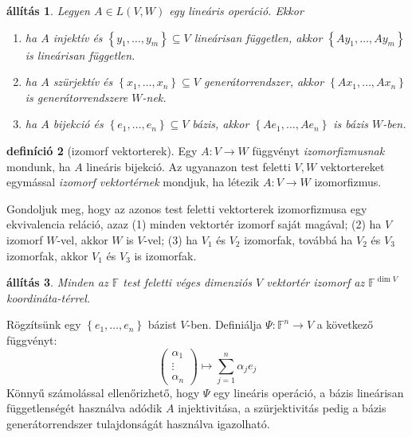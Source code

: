 \documentclass[9pt, showtrims]{memoir}
\makeatletter
\renewenvironment{proof}[1][\proofname]
    {\par\pushQED{\qed}%
    \normalfont \topsep6\p@\@plus6\p@\relax
    \trivlist
    \item[\hskip\labelsep
        \itshape
    #1\@addpunct{:}]\ignorespaces}
    {\popQED\endtrivlist\@endpefalse}
\theoremstyle{plain}
\newtheorem{proposition}{állítás}[section]
\theoremstyle{remark}
\theoremstyle{definition}
\newtheorem{definition}[proposition]{definíció}
\renewcommand{\mathbf}{\mathbb}
\makeatother
\begin{document}
\begin{proposition}
    Legyen $A\in L\left( V,W \right)$ egy lineáris operáció.
    Ekkor
    \begin{enumerate}
        \item ha $A$ injektív és $\left\{ y_1,\dots,y_m \right\}\subseteq V$
            lineárisan független,
            akkor 
            $\left\{ Ay_1,\dots,Ay_m \right\}$ is lineárisan független.
        \item ha $A$ szürjektív és $\left\{ x_1,\dots,x_n \right\}\subseteq V$
            generátorrendszer,
            akkor 
            $\left\{ Ax_1,\dots,Ax_n \right\}$ is generátorrendszere $W$-nek.
        \item ha $A$ bijekció és $\left\{ e_1,\dots,e_n \right\}\subseteq V$
            bázis,
            akkor 
            $\left\{ Ae_1,\dots,Ae_n \right\}$ is bázis $W$-ben.
            \qedhere
    \end{enumerate}
\end{proposition}
\begin{definition}[izomorf vektorterek]
    Egy $A:V\to W$ függvényt \emph{izomorfizmusnak} mondunk,
    ha $A$ lineáris bijekció.
    Az ugyanazon test feletti $V,W$ vektortereket egymással \emph{izomorf vektortérnek} mondjuk,
    ha létezik $A:V\to W$ izomorfizmus.
\end{definition}
Gondoljuk meg, hogy az azonos test feletti vektorterek izomorfizmusa egy ekvivalencia reláció,
azaz (1) minden vektortér izomorf saját magával; (2) ha $V$ izomorf $W$-vel,
akkor $W$ is $V$-vel; (3) ha $V_1$ és $V_2$ izomorfak, továbbá ha $V_2$ és $V_3$ izomorfak, akkor 
$V_1$ és $V_3$ is izomorfak.
\begin{proposition}
    Minden az $\mathbb{F}$ test feletti véges dimenziós $V$ vektortér izomorf az $\mathbb{F}^{\dim V}$
    koordináta-térrel.
\end{proposition}
\begin{proof}
    Rögzítsünk egy $\left\{ e_1,\dots,e_n \right\}$ bázist $V$-ben.
    Definiálja $\Psi:\mathbf{F}^n\to V$ a következő függvényt:
    \[
        \begin{pmatrix}
            \alpha_1\\ \vdots\\ \alpha_n
        \end{pmatrix}
        \mapsto\sum_{j=1}^n\alpha_je_j
    \]
    Könnyű számolással ellenőrizhető,
    hogy $\Psi$ egy lineáris operáció,
    a bázis lineárisan függetlenségét használva adódik $A$ injektivitása,
    a szürjektivitás pedig a bázis generátorrendszer tulajdonságát használva igazolható.
\end{proof}
\end{document}
